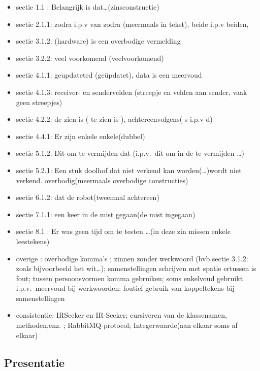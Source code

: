 \documentclass[12pt,a4paper]{report}
\begin{document}
\begin{itemize}
	\item sectie 1.1  : Belangrijk is dat\ldots (zinsconstructie)
	\item sectie 2.1.1: zodra i.p.v van zodra (meermaals in tekst), beide i.p.v beiden,
	\item sectie 3.1.2: (hardware) is een overbodige vermelding  
	\item sectie 3.2.2: veel voorkomend (veelvoorkomend)
	\item sectie 4.1.1: geupdateted (ge\"updatet), data is een meervoud
	\item sectie 4.1.3: receiver- en sendervelden (streepje en velden aan sender, vaak geen streepjes)
	\item sectie 4.2.2: de zien is  (  te zien is ), achtereenvolgens( s i.p.v d)
	\item sectie 4.4.1: Er zijn enkele enkele(dubbel)
	\item sectie 5.1.2: Dit om te vermijden dat (i.p.v.\ dit om in de te vermijden \ldots)
	\item sectie 5.2.1: Een stuk doolhof dat niet verkend kan worden(\ldots)wordt niet verkend. overbodig(meermaals overbodige constructies)
	\item sectie 6.1.2: dat de robot(tweemaal achtereen)
	\item sectie 7.1.1: een keer in de mist gegaan(de mist ingegaan)
	\item sectie 8.1  : Er was geen tijd om te testen \ldots (in deze zin missen enkele leestekens)
	\item overige     : overbodige komma's ; zinnen zonder werkwoord (bvb sectie 3.1.2: zoals bijvoorbeeld het wit\ldots); samenstellingen schrijven met spatie ertussen is fout; tussen persoonsvormen komma gebruiken;  soms enkelvoud gebruikt i.p.v.\ meervoud bij werkwoorden; foutief gebruik van koppeltekens bij samenstellingen
	\item consistentie: IRSeeker en IR-Seeker; cursiveren van de klassenamen, methoden,enz. ; RabbitMQ-protocol; Integerwaarde(aan elkaar soms af elkaar)
\end{itemize}

\subsection{Presentatie}
\end{document}
